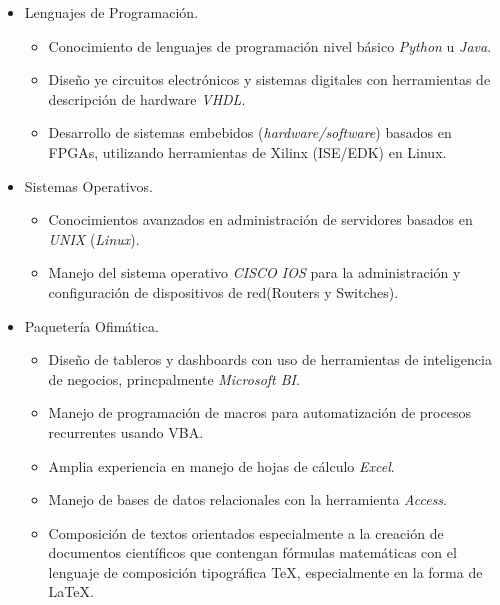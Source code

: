 \documentclass[21pt, onecolumn]{article} %
\begin{document}
\begin{itemize}
\item Lenguajes de Programación.
\begin{itemize}
 \item Conocimiento de lenguajes de programación nivel básico \emph{Python} u \emph{Java}.
 \item Diseño ye circuitos electrónicos y sistemas digitales con herramientas de
descripción de hardware \emph{VHDL}.
 \item Desarrollo de sistemas embebidos (\emph{hardware/software}) basados en
FPGAs, utilizando herramientas de Xilinx (ISE/EDK) en Linux.
\end{itemize}

\item Sistemas Operativos.
\begin{itemize}
 \item Conocimientos avanzados en administración de servidores
basados en \emph{UNIX} (\emph{Linux}).
\item Manejo del sistema operativo \emph{CISCO IOS} para la administración y
configuración de dispositivos de red(Routers y Switches).
\end{itemize}

\item Paquetería Ofimática.
\begin{itemize}
 \item Diseño de tableros y dashboards con uso de herramientas de inteligencia de negocios, princpalmente \emph{Microsoft BI}.
 \item Manejo de programación de macros para automatización de procesos recurrentes usando VBA.
 \item Amplia experiencia en manejo de hojas de cálculo \emph{Excel}.
 \item Manejo de bases de datos relacionales con la herramienta  \emph{Access}.
 \item Composición de textos orientados especialmente a la creación de
documentos científicos que contengan fórmulas matemáticas con el lenguaje de
composición tipográfica \TeX, especialmente en la forma de {\LaTeX}.
\end{itemize}

\end{itemize}
\end{document}
